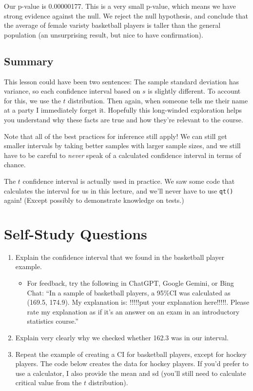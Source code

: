 \documentclass[
  letterpaper,
  DIV=11,
  numbers=noendperiod,
  oneside]{scrreprt}
\providecommand{\tightlist}{%
  \setlength{\itemsep}{0pt}\setlength{\parskip}{0pt}}\usepackage{longtable,booktabs,array}
\begin{document}
Our p-value is 0.00000177. This is a very small p-value, which means we
have strong evidence against the null. We reject the null hypothesis,
and conclude that the average of female varisty basketball players is
taller than the general population (an unsurprising result, but nice to
have confirmation).

\hypertarget{summary-7}{%
\section{Summary}\label{summary-7}}

This lesson could have been two sentences: The sample standard deviation
has variance, so each confidence interval based on \(s\) is slightly
different. To account for this, we use the \(t\) distribution. Then
again, when someone tells me their name at a party I immediately forget
it. Hopefully this long-winded exploration helps you understand why
these facts are true and how they're relevant to the course.

Note that all of the best practices for inference still apply! We can
still get smaller intervals by taking better samples with larger sample
sizes, and we still have to be careful to \emph{never} speak of a
calculated confidence interval in terms of chance.

The \(t\) confidence interval is actually used in practice. We saw some
code that calculates the interval for us in this lecture, and we'll
never have to use \texttt{qt()} again! (Except possibly to demonstrate
knowledge on tests.)

\hypertarget{self-study-questions-5}{%
\chapter{Self-Study Questions}\label{self-study-questions-5}}

\begin{enumerate}
\def\labelenumi{\arabic{enumi}.}
\tightlist
\item
  Explain the confidence interval that we found in the basketball player
  example.

  \begin{itemize}
  \tightlist
  \item
    For feedback, try the following in ChatGPT, Google Gemini, or Bing
    Chat: ``In a sample of basketball players, a 95\%CI was calculated
    as (169.5, 174.9). My explanation is: !!!!!put your explanation
    here!!!!!. Please rate my explanation as if it's an answer on an
    exam in an introductory statistics course.''
  \end{itemize}
\item
  Explain very clearly why we checked whether 162.3 was in our interval.
\item
  Repeat the example of creating a CI for basketball players, except for
  hockey players. The code below creates the data for hockey players. If
  you'd prefer to use a calculator, I also provide the mean and sd
  (you'll still need to calculate critical value from the \(t\)
  distribution).
\end{enumerate}
\end{document}
